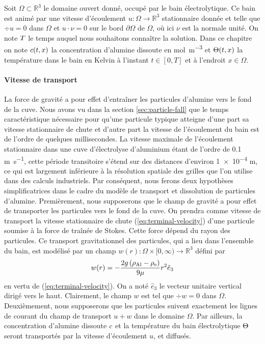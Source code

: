 Soit $\Omega\subset \mathbb R^3$ le domaine ouvert donné, occupé par
le bain électrolytique. Ce bain est animé par une vitesse d'écoulement
$u:\Omega\to\mathbb R^3$ stationnaire donnée et telle que $\div u = 0$
dans $\Omega$ et $u\cdot \nu = 0$ sur le bord $\partial \Omega$ de
$\Omega$, où ici $\nu$ est la normale unité. On note $T$ le temps
auquel nous souhaitons connaître la solution. Dans ce chapitre on note
$c(t, x)$ la concentration d'alumine dissoute en
\si{\mol\per\cubic\meter} et $\Theta(t, x)$ la température dans
le bain en Kelvin à l'instant $t \in [0, T]$ et à l'endroit $x \in
\Omega$.

\paragraph{Vitesse de transport}
La force de gravité a pour effet d'entraîner les particules d'alumine
vers le fond de la cuve. Nous avons vu dans la section
\ref{sec:particle-fall} que le temps caractéristique nécessaire pour
qu'une particule typique atteigne d'une part sa vitesse stationnaire de
chute et d'autre part la vitesse de l'écoulement du bain est de
l'ordre de quelques millisecondes. La vitesse maximale de l'écoulement
stationnaire dans une cuve d'électrolyse d'aluminium étant de l'ordre
de \num{0.1} \si{\meter\per\second}, cette période transitoire s'étend
sur des distances d'environ \num{1e-4} \si{\meter}, ce qui est
largement inférieure à la résolution spatiale des grilles que l'on
utilise dans des calculs industriels. Par conséquent, nous ferons deux
hypothèses simplificatrices dans le cadre du modèle de transport et
dissolution de particules d'alumine. Premièrement, nous supposerons
que le champ de gravité a pour effet de transporter les particules
vers le fond de la cuve. On prendra comme vitesse de transport la
vitesse stationnaire de chute (\ref{eq:terminal-velocity}) d'une
particule soumise à la force de traînée de Stokes. Cette force dépend
du rayon des particules. Ce transport gravitationnel des particules, qui
a lieu dans l'ensemble du bain, est modélisé par un champ $w(r):
\Omega\times[0, \infty)\to\mathbb R^3$ défini par
\begin{equation}\label{eq:fall-velocity}
  w(r) =
  -\frac{2g\left( \rho_\mathrm{Al} -
      \rho_\mathrm{e} \right)}{9\mu} r^2 \hat e_3
\end{equation}
en vertu de (\ref{eq:terminal-velocity}). On a noté $\hat e_3$ le
vecteur unitaire vertical dirigé vers le haut. Clairement, le champ
$w$ est tel que $\div w = 0$ dans $\Omega$. Deuxièmement, nous
supposerons que les particules suivent exactement les lignes de
courant du champ de transport $u + w$ dans le domaine $\Omega$. Par
ailleurs, la concentration d'alumine dissoute $c$ et la
température du bain électrolytique $\Theta$ seront transportés
par la vitesse d'écoulement $u$, et diffusés.

